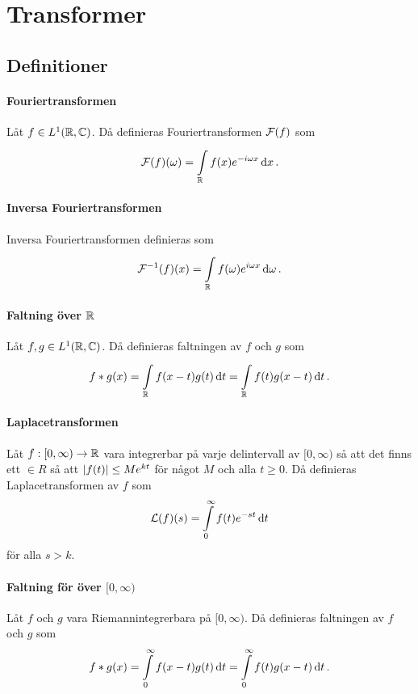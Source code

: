 \section{Transformer}

\subsection{Definitioner}

\paragraph{Fouriertransformen}
Låt $f\in L^{1}(\mathbb{R}, \mathbb{C})$. Då definieras Fouriertransformen $\mathcal{F}(f)$ som
\begin{align*}
	\mathcal{F}(f)(\omega) = \int\limits_{\mathbb{R}}^{}f(x)e^{-i\omega x}\dd{x}.
\end{align*}

\paragraph{Inversa Fouriertransformen}
Inversa Fouriertransformen definieras som
\begin{align*}
	\mathcal{F}^{-1}(f)(x) = \int\limits_{\mathbb{R}}^{}f(\omega)e^{i\omega x}\dd{\omega}.
\end{align*}

\paragraph{Faltning över $\mathbb{R}$}
Låt $f, g\in L^{1}(\mathbb{R}, \mathbb{C})$. Då definieras faltningen av $f$ och $g$ som
\begin{align*}
	f * g(x) = \int\limits_{\mathbb{R}}^{}f(x - t)g(t)\dd{t} = \int\limits_{\mathbb{R}}^{}f(t)g(x - t)\dd{t}.
\end{align*}

\paragraph{Laplacetransformen}
Låt $f: [0, \infty)\to\mathbb{R}$ vara integrerbar på varje delintervall av $[0, \infty)$ så att det finns ett $\in R$ så att $\abs{f(t)}\leq Me^{kt}$ för något $M$ och alla $t \geq 0$. Då definieras Laplacetransformen av $f$ som
\begin{align*}
	\mathcal{L}(f)(s) = \int\limits_{0}^{\infty}f(t)e^{-st}\dd{t}
\end{align*}
för alla $s > k$.

\paragraph{Faltning för över $[0, \infty)$}
Låt $f$ och $g$ vara Riemannintegrerbara på $[0, \infty)$. Då definieras faltningen av $f$ och $g$ som
\begin{align*}
	f * g(x) = \int\limits_{0}^{\infty}f(x - t)g(t)\dd{t} = \int\limits_{0}^{\infty}f(t)g(x - t)\dd{t}.
\end{align*}

